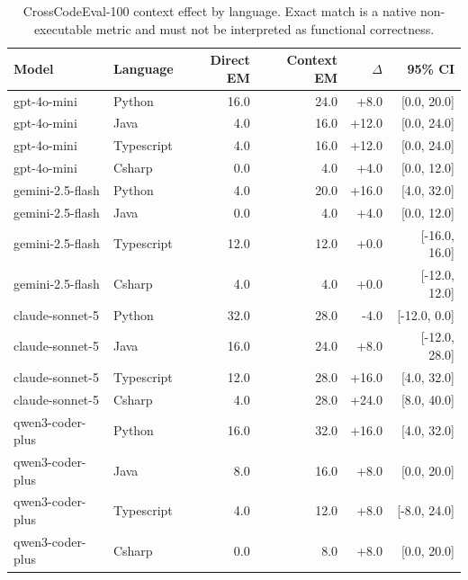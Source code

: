 \begin{table}[t]
\centering
\scriptsize
\caption{CrossCodeEval-100 context effect by language. Exact match is a native non-executable metric and must not be interpreted as functional correctness.}
\label{tab:language_generalization}
\begin{tabular}{llrrrr}
\toprule
Model & Language & Direct EM & Context EM & $\Delta$ & 95\% CI \\
\midrule
gpt-4o-mini & Python & 16.0 & 24.0 & +8.0 & [0.0, 20.0] \\
gpt-4o-mini & Java & 4.0 & 16.0 & +12.0 & [0.0, 24.0] \\
gpt-4o-mini & Typescript & 4.0 & 16.0 & +12.0 & [0.0, 24.0] \\
gpt-4o-mini & Csharp & 0.0 & 4.0 & +4.0 & [0.0, 12.0] \\
gemini-2.5-flash & Python & 4.0 & 20.0 & +16.0 & [4.0, 32.0] \\
gemini-2.5-flash & Java & 0.0 & 4.0 & +4.0 & [0.0, 12.0] \\
gemini-2.5-flash & Typescript & 12.0 & 12.0 & +0.0 & [-16.0, 16.0] \\
gemini-2.5-flash & Csharp & 4.0 & 4.0 & +0.0 & [-12.0, 12.0] \\
claude-sonnet-5 & Python & 32.0 & 28.0 & -4.0 & [-12.0, 0.0] \\
claude-sonnet-5 & Java & 16.0 & 24.0 & +8.0 & [-12.0, 28.0] \\
claude-sonnet-5 & Typescript & 12.0 & 28.0 & +16.0 & [4.0, 32.0] \\
claude-sonnet-5 & Csharp & 4.0 & 28.0 & +24.0 & [8.0, 40.0] \\
qwen3-coder-plus & Python & 16.0 & 32.0 & +16.0 & [4.0, 32.0] \\
qwen3-coder-plus & Java & 8.0 & 16.0 & +8.0 & [0.0, 20.0] \\
qwen3-coder-plus & Typescript & 4.0 & 12.0 & +8.0 & [-8.0, 24.0] \\
qwen3-coder-plus & Csharp & 0.0 & 8.0 & +8.0 & [0.0, 20.0] \\
\bottomrule
\end{tabular}
\end{table}
